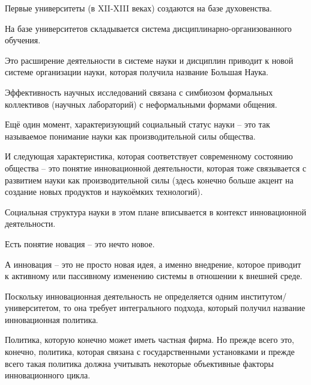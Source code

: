 \documentclass[main.tex]{subfiles}
\begin{document}

Первые университеты (в XII-XIII веках) создаются на базе духовенства.

На базе университетов складывается система дисциплинарно-организованного обучения.

Это расширение деятельности в системе науки и дисциплин приводит к новой системе организации науки, которая получила название Большая Наука.



Эффективность научных исследований связана с симбиозом формальных коллективов (научных лабораторий) с неформальными формами общения.



Ещё один момент, характеризующий социальный статус науки -- это так называемое понимание науки как производительной силы общества.



И следующая характеристика, которая соответствует современному состоянию общества -- это понятие инновационной деятельности, которая тоже связывается с развитием науки как производительной силы (здесь конечно больше акцент на создание новых продуктов и наукоёмких технологий).

Социальная структура науки в этом плане вписывается  в контекст инновационной деятельности.

Есть понятие новация -- это нечто новое.

А инновация -- это не просто новая идея, а именно внедрение, которое приводит к активному или пассивному изменению системы в отношении к внешней среде.



Поскольку инновационная деятельность не определяется одним институтом/университетом, то она требует интегрального подхода, который получил название инновационная политика.

Политика, которую конечно может иметь частная фирма.
Но прежде всего это, конечно, политика, которая связана с государственными установками и прежде всего такая политика должна учитывать некоторые объективные факторы инновационного цикла.
\end{document}
